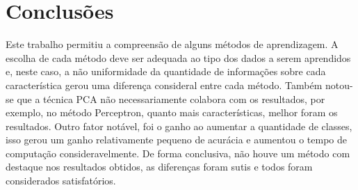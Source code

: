 \documentclass[12pt]{article}
\begin{document}
\newpage

\section{Conclusões}
	Este trabalho permitiu a compreensão de alguns métodos de aprendizagem. A escolha de cada método deve ser adequada ao tipo dos dados a serem aprendidos e, neste caso, a não uniformidade da quantidade de informações sobre cada característica gerou uma diferença consideral entre cada método. Também notou-se que a técnica PCA não necessariamente colabora com os resultados, por exemplo, no método Perceptron, quanto mais características, melhor foram os resultados. Outro fator notável, foi o ganho ao aumentar a quantidade de classes, isso gerou um ganho relativamente pequeno de acurácia e aumentou o tempo de computação consideravelmente. De forma conclusiva, não houve um método com destaque nos resultados obtidos, as diferenças foram sutis e todos foram considerados satisfatórios.



\end{document}
